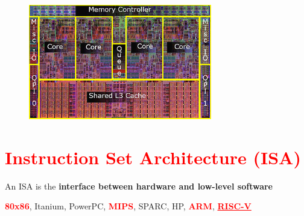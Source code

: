 \documentclass[
  14pt,
  a4paper,
  DIV=11,
  numbers=noendperiod,
  headinclude=true,
  footinclude=true]{scrreprt}
\begin{document}
\begin{figure}[H]
\begin{minipage}{0.50\linewidth}
\end{minipage}%
%
\begin{minipage}{0.50\linewidth}
\includegraphics[width=8cm,height=\textheight]{lecture1-3/images/corei7diagram.png}\end{minipage}%

\end{figure}%

\chapter{\texorpdfstring{\textcolor{red}{Instruction Set Architecture
(ISA)}}{Instruction Set Architecture (ISA)}}\label{instruction-set-architecture-isa}

An ISA is the \textbf{interface between hardware and low-level software}

\begin{tcolorbox}[colback=boxbodycol, colframe=boxheadcol, title=Some modern instruction set architectures:, coltitle=boxtitlecol, colbacktitle=boxheadcol]
\textcolor{red}{\textbf{80x86}}, Itanium, PowerPC,
\textcolor{red}{\textbf{MIPS}}, SPARC, HP,
\textcolor{red}{\textbf{ARM}},
\textcolor{red}{\textbf{\underline{RISC-V}}}

\end{tcolorbox}
\end{document}
